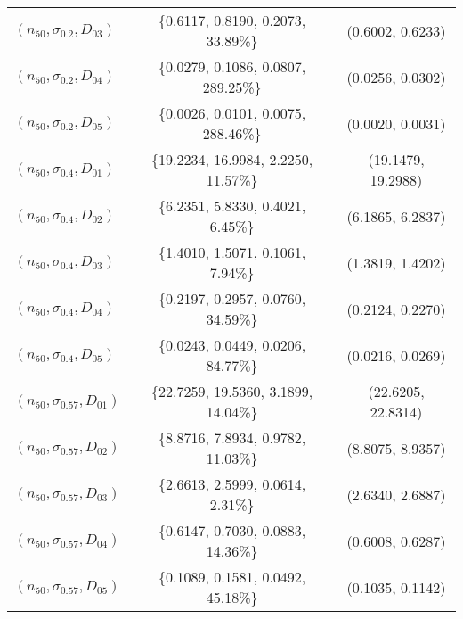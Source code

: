 \documentclass[preprint,12pt]{elsarticle}
\begin{document}
\begin{table} [h]
\begin{tabular}{|l|c c|}
$(n_{50},\sigma_{0.2},D_{03})$ &\{0.6117, 0.8190, 0.2073, 33.89\%\}&(0.6002, 0.6233)\\
$(n_{50},\sigma_{0.2},D_{04})$ &\{0.0279, 0.1086, 0.0807, 289.25\%\}&(0.0256, 0.0302)\\
$(n_{50},\sigma_{0.2},D_{05})$ &\{0.0026, 0.0101, 0.0075, 288.46\%\}&(0.0020, 0.0031)\\
$(n_{50},\sigma_{0.4},D_{01})$ &\{19.2234, 16.9984, 2.2250, 11.57\%\}&(19.1479, 19.2988)\\
$(n_{50},\sigma_{0.4},D_{02})$ &\{6.2351, 5.8330, 0.4021, 6.45\%\}&(6.1865, 6.2837)\\
$(n_{50},\sigma_{0.4},D_{03})$ &\{1.4010, 1.5071, 0.1061, 7.94\%\}&(1.3819, 1.4202)\\
$(n_{50},\sigma_{0.4},D_{04})$ &\{0.2197, 0.2957, 0.0760, 34.59\%\}&(0.2124, 0.2270)\\
$(n_{50},\sigma_{0.4},D_{05})$ &\{0.0243, 0.0449, 0.0206, 84.77\%\}&(0.0216, 0.0269)\\
$(n_{50},\sigma_{0.57},D_{01})$ &\{22.7259, 19.5360, 3.1899, 14.04\%\}&(22.6205, 22.8314)\\
$(n_{50},\sigma_{0.57},D_{02})$ &\{8.8716, 7.8934, 0.9782, 11.03\%\}&(8.8075, 8.9357)\\
$(n_{50},\sigma_{0.57},D_{03})$ &\{2.6613, 2.5999, 0.0614, 2.31\%\}&(2.6340, 2.6887)\\
$(n_{50},\sigma_{0.57},D_{04})$ &\{0.6147, 0.7030, 0.0883, 14.36\%\}&(0.6008, 0.6287)\\
$(n_{50},\sigma_{0.57},D_{05})$ &\{0.1089, 0.1581, 0.0492, 45.18\%\}&(0.1035, 0.1142)\\
\hline
\end{tabular}
\end{table}
\end{document}
